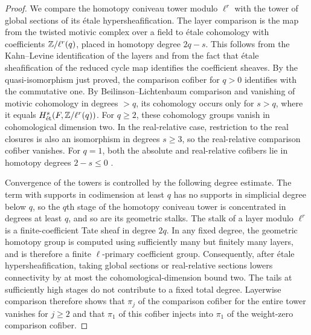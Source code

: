 \begin{proof}
We compare the homotopy coniveau tower modulo $\ell^r$ with the tower of global sections of its \'etale hypersheafification.
The layer comparison is the map from the twisted motivic complex over a field to \'etale cohomology with coefficients $\mathbb Z/\ell^r(q)$, placed in homotopy degree $2q-s$.
This follows from the Kahn--Levine identification of the layers and from the fact that \'etale sheafification of the reduced cycle map identifies the coefficient sheaves.
By the quasi-isomorphism just proved, the comparison cofiber for $q>0$ identifies with the commutative one.
By Beilinson--Lichtenbaum comparison and vanishing of motivic cohomology in degrees $>q$, its cohomology occurs only for $s>q$, where it equals $H^s_{\mathrm{\acute et}}(F,\mathbb Z/\ell^r(q))$.
For $q\ge2$, these cohomology groups vanish in cohomological dimension two.
In the real-relative case, restriction to the real closures is also an isomorphism in degrees $s\ge3$, so the real-relative comparison cofiber vanishes.
For $q=1$, both the absolute and real-relative cofibers lie in homotopy degrees $2-s\le0$ \cite[Theorem 6.5.5, \S6.9]{KahnLevine2010}.

Convergence of the towers is controlled by the following degree estimate.
The term with supports in codimension at least $q$ has no supports in simplicial degree below $q$, so the $q$th stage of the homotopy coniveau tower is concentrated in degrees at least $q$, and so are its geometric stalks.
The stalk of a layer modulo $\ell^r$ is a finite-coefficient Tate sheaf in degree $2q$.
In any fixed degree, the geometric homotopy group is computed using sufficiently many but finitely many layers, and is therefore a finite $\ell$-primary coefficient group.
Consequently, after \'etale hypersheafification, taking global sections or real-relative sections lowers connectivity by at most the cohomological-dimension bound two.
The tails at sufficiently high stages do not contribute to a fixed total degree.
Layerwise comparison therefore shows that $\pi_j$ of the comparison cofiber for the entire tower vanishes for $j\ge2$ and that $\pi_1$ of this cofiber injects into $\pi_1$ of the weight-zero comparison cofiber.


\end{proof}
